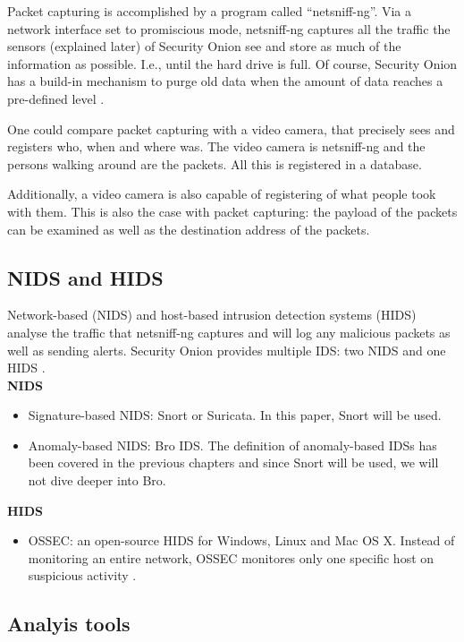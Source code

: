 Packet capturing is accomplished by a program called ``netsniff-ng''. Via a network interface set to promiscious mode, netsniff-ng captures all the traffic the sensors (explained later) of Security Onion see and store as much of the information as possible. I.e., until the hard drive is full. Of course, Security Onion has a build-in mechanism to purge old data when the amount of data reaches a pre-defined level \citep{SO1}.

One could compare packet capturing with a video camera, that precisely sees and registers who, when and where was. The video camera is netsniff-ng and the persons walking around are the packets. All this is registered in a database.

Additionally, a video camera is also capable of registering of what people took with them. This is also the case with packet capturing: the payload of the packets can be examined as well as the destination address of the packets.

\subsection{NIDS and HIDS}

Network-based (NIDS) and host-based intrusion detection systems (HIDS) analyse the traffic that netsniff-ng captures and will log any malicious packets as well as sending alerts. Security Onion provides multiple IDS: two NIDS and one HIDS \citep{SO1}. \\
\textbf{NIDS}
\begin{itemize}
\item Signature-based NIDS: Snort or Suricata. In this paper, Snort will be used.
\item Anomaly-based NIDS: Bro IDS. The definition of anomaly-based IDSs has been covered in the previous chapters and since Snort will be used, we will not dive deeper into Bro.
\end{itemize}
\textbf{HIDS}
\begin{itemize}
\item OSSEC: an open-source HIDS for Windows, Linux and Mac OS X. Instead of monitoring an entire network, OSSEC monitores only one specific host on suspicious activity \citep{OSSEC}.
\end{itemize}

\subsection{Analyis tools}

